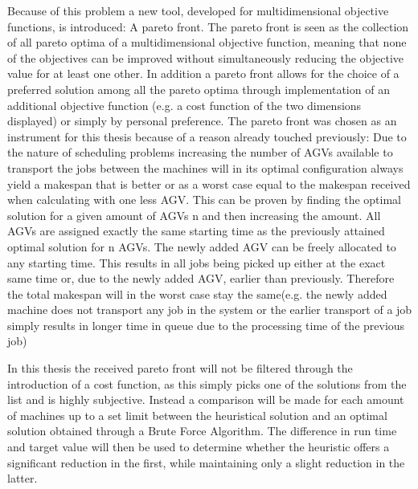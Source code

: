 Because of this problem a new tool, developed for multidimensional objective functions, is introduced: A pareto front. The pareto front is seen as the collection of all pareto optima of a multidimensional objective function, meaning that none of the objectives can be improved without simultaneously reducing the objective value for at least one other. In addition a pareto front allows
for the choice of a preferred solution among all the pareto optima through implementation of an additional objective function (e.g. a cost function of the two dimensions
displayed) or simply by personal preference. The pareto front was chosen as an instrument for this thesis because of a reason already touched
previously: Due to the nature of scheduling problems increasing the number of AGVs available to transport the jobs between the machines will in
its optimal configuration always yield a makespan that is better or as a worst case equal to the makespan received when calculating with one less
AGV. This can be proven by finding the optimal solution for a given amount of AGVs n and then increasing the amount. All AGVs are assigned
exactly the same starting time as the previously attained optimal solution for n AGVs. The newly added AGV can be freely allocated to any starting
time. This results in all jobs being picked up either at the exact same time or, due to the newly added AGV, earlier than previously.
Therefore the total makespan will in the worst case stay the same(e.g. the newly added machine does not transport any job in the system or the
earlier transport of a job simply results in longer time in queue due to the processing time of the previous job)

In this thesis the received pareto front will not be filtered through the introduction of a cost function, as this simply picks one of the solutions
from the list and is highly subjective. Instead a comparison will be made for each amount of machines up to a set limit between the heuristical solution and an optimal
solution obtained through a Brute Force Algorithm. The difference in run time and target value will then be used to determine whether the heuristic
offers a significant reduction in the first, while maintaining only a slight reduction in the latter.

